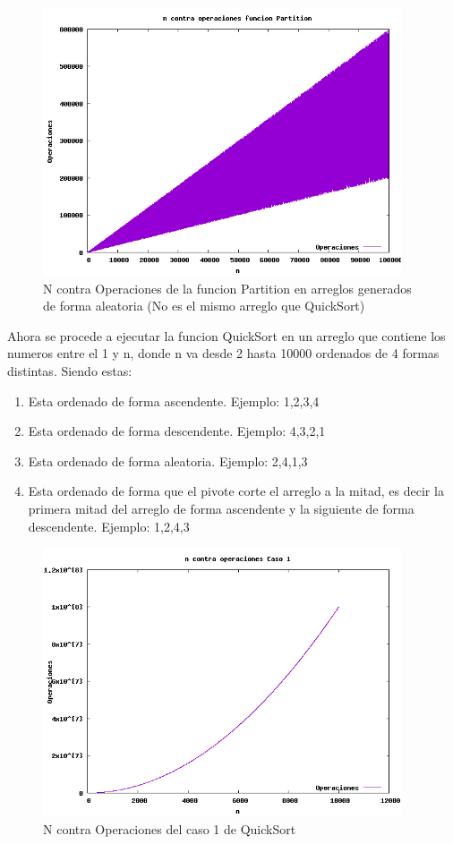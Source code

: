 \documentclass[spanish]{article}
\begin{document}
	\begin{figure}[H]
		\centering
		\includegraphics[width=400px,height=300px]{grafica2}
		\caption{N contra Operaciones de la funcion Partition en arreglos generados de forma aleatoria (No es el mismo arreglo que QuickSort)}
	\end{figure}	
	Ahora se procede a ejecutar la funcion QuickSort en un arreglo que contiene los numeros entre el 1 y n, donde n va desde 2 hasta 10000 ordenados de 4 formas distintas. Siendo estas:\
	\begin{enumerate}
		\item Esta ordenado de forma ascendente. Ejemplo: 1,2,3,4
		\item Esta ordenado de forma descendente. Ejemplo: 4,3,2,1
		\item Esta ordenado de forma aleatoria. Ejemplo: 2,4,1,3
		\item Esta ordenado de forma que el pivote corte el arreglo a la mitad, es decir la primera mitad del arreglo de forma ascendente y la siguiente de forma descendente. Ejemplo: 1,2,4,3
	\end{enumerate}
	\begin{figure}[H]
		\centering
		\includegraphics[width=400px,height=300px]{grafica3}
		\caption{N contra Operaciones del caso 1 de QuickSort}
	\end{figure}	
\end{document}
